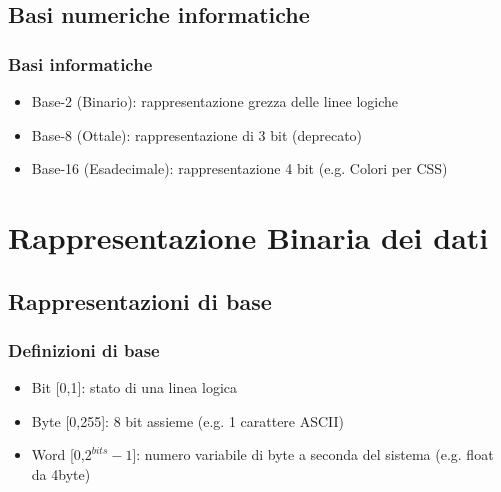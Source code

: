 \documentclass{beamer}
\begin{document}
	\subsection{Basi numeriche informatiche}
  \begin{frame}
    \frametitle{Basi informatiche}
    \begin{itemize}
    		\item Base-2 (Binario): rappresentazione grezza delle linee logiche
    		\item Base-8 (Ottale): rappresentazione di 3 bit (deprecato)
    		\item Base-16 (Esadecimale): rappresentazione 4 bit (e.g. Colori per CSS)
    \end{itemize}
  \end{frame}

	\section[BinaryData]{Rappresentazione Binaria dei dati}
	\subsection{Rappresentazioni di base}  
  \begin{frame}
    \frametitle{Definizioni di base}    	
    \begin{itemize}
    		\item Bit [0,1]: stato di una linea logica
    		\item Byte [0,255]: 8 bit assieme (e.g. 1 carattere ASCII)
    		\item Word [0,$2^{bits}-1$]: numero variabile di byte a seconda del sistema (e.g. float da 4byte)
    \end{itemize}
  \end{frame}
\end{document}
